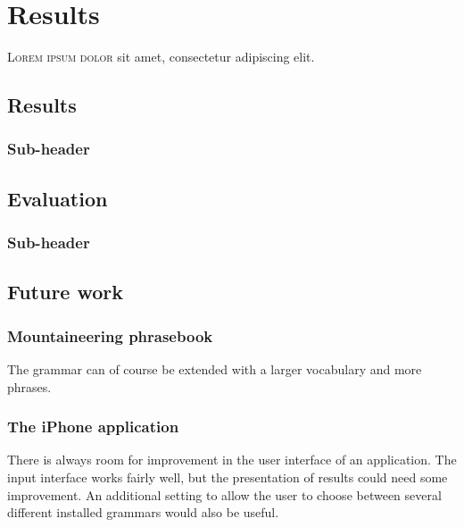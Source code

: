 \chapter{Results}
\lettrine[lines=4, loversize=-0.1, lraise=0.1]{L}{orem ipsum dolor} sit amet, consectetur adipiscing elit.


\section{Results}
\subsection{Sub-header}


\section{Evaluation}
\subsection{Sub-header}


\section{Future work}


\subsection{Mountaineering phrasebook}
The grammar can of course be extended with a larger vocabulary and more phrases.


\subsection{The iPhone application}
There is always room for improvement in the user interface of an application. The input interface works fairly well, but the presentation of results could need some improvement. An additional setting to allow the user to choose between several different installed grammars would also be useful.
